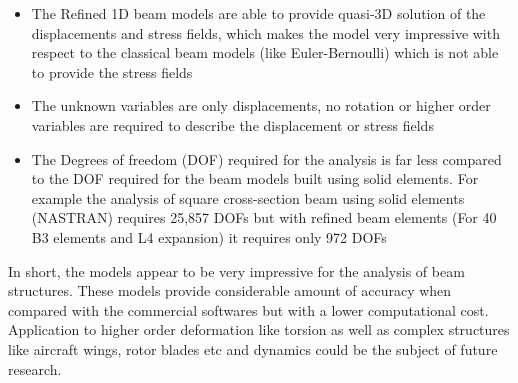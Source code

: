 \documentclass[a4paper,12pt]{article}
\begin{document}
\begin{itemize}
\item The Refined 1D beam models are able to provide quasi-3D solution of the displacements and stress fields, which makes the model very impressive with respect to the classical beam models (like Euler-Bernoulli) which is not able to provide the stress fields

\item The unknown variables are only displacements, no rotation or higher order variables are required to describe the displacement or stress fields

\item The Degrees of freedom (DOF) required for the analysis is far less compared to the DOF required for the beam models built using solid elements. For example the analysis of square cross-section beam using solid elements (NASTRAN) requires 25,857 DOFs but with refined beam elements (For 40 B3 elements and L4 expansion) it requires only 972 DOFs

\end{itemize}
In short, the models appear to be very impressive for the analysis of beam structures. These models provide considerable amount of accuracy when compared with the commercial softwares but with a lower computational cost. Application to higher order deformation like torsion as well as complex structures like aircraft wings, rotor blades etc and dynamics could be the subject of future research.


\newpage

 
\end{document}
